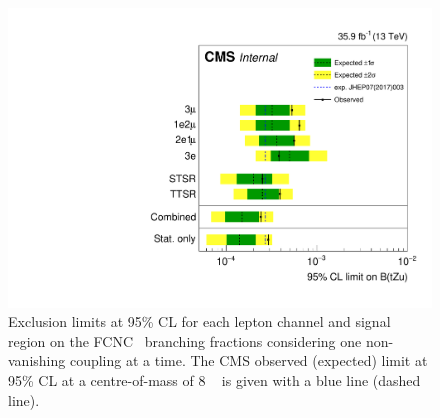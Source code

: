 \begin{figure}[htbp]
	\centering
	\includegraphics[width=0.7\linewidth]{6_Search/Figures/TOP-17-017_limitsZutStat.pdf}
	\caption{Exclusion limits at 95\% CL for each lepton channel and signal region on the FCNC \Zut\ branching fractions considering one non-vanishing coupling at a time. The CMS observed (expected) limit at 95\% CL at a centre-of-mass of 8 \TeV~\cite{Sirunyan:2017kkr} is given with a blue line (dashed line).}	
	\label{fig:exclusionlimitbrcomp}
\end{figure}

